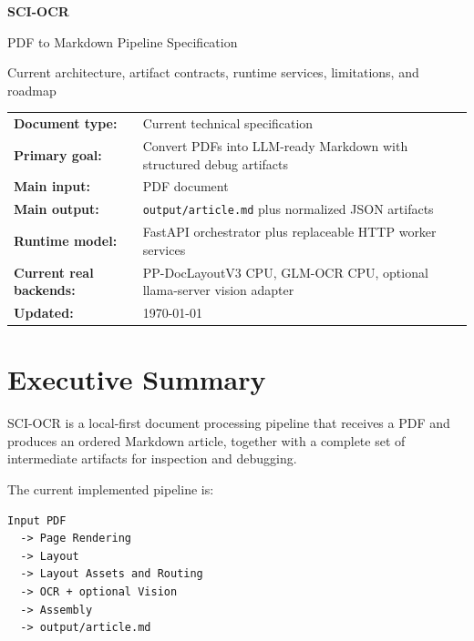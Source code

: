 \documentclass[11pt,a4paper]{article}
\begin{document}
\begin{titlepage}
\centering
\vspace*{3cm}
{\Huge\bfseries SCI-OCR\par}
\vspace{0.5cm}
{\Large PDF to Markdown Pipeline Specification\par}
\vspace{1.2cm}
{\large Current architecture, artifact contracts, runtime services, limitations, and roadmap\par}
\vspace{2cm}

\begin{tabular}{>{\bfseries}p{4.4cm}p{8.4cm}}
Document type: & Current technical specification \\
Primary goal: & Convert PDFs into LLM-ready Markdown with structured debug artifacts \\
Main input: & PDF document \\
Main output: & \texttt{output/article.md} plus normalized JSON artifacts \\
Runtime model: & FastAPI orchestrator plus replaceable HTTP worker services \\
Current real backends: & PP-DocLayoutV3 CPU, GLM-OCR CPU, optional llama-server vision adapter \\
Updated: & \today \\
\end{tabular}

\vfill
\end{titlepage}

\tableofcontents
\newpage
{}

\section{Executive Summary}

SCI-OCR is a local-first document processing pipeline that receives a PDF and
produces an ordered Markdown article, together with a complete set of
intermediate artifacts for inspection and debugging.

The current implemented pipeline is:

\begin{lstlisting}
Input PDF
  -> Page Rendering
  -> Layout
  -> Layout Assets and Routing
  -> OCR + optional Vision
  -> Assembly
  -> output/article.md
\end{lstlisting}
\end{document}
